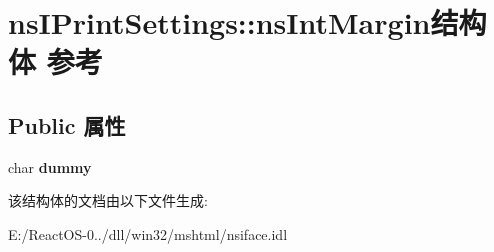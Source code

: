 \hypertarget{structns_i_print_settings_1_1ns_int_margin}{}\section{ns\+I\+Print\+Settings\+:\+:ns\+Int\+Margin结构体 参考}
\label{structns_i_print_settings_1_1ns_int_margin}
\subsection*{Public 属性}
\begin{DoxyCompactItemize}
\item 
\mbox{\label{structns_i_print_settings_1_1ns_int_margin_ae2e17edfc4a62ab42ce4c46eb2c0aa92}} 
char {\bfseries dummy}
\end{DoxyCompactItemize}


该结构体的文档由以下文件生成\+:\begin{DoxyCompactItemize}
\item 
E\+:/\+React\+O\+S-\/0../dll/win32/mshtml/nsiface.\+idl\end{DoxyCompactItemize}

